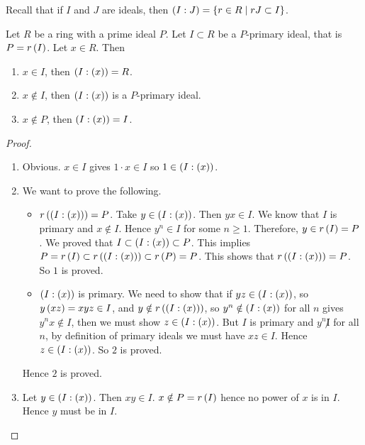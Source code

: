 \pagebreak

Recall that if $ I $ and $ J $ are ideals, then $ \left( I : J \right) = \left\{ r \in R \mid rJ \subset I \right\} $.

\begin{lemma}
\label{lem:11.7}
Let $ R $ be a ring with a prime ideal $ P $. Let $ I \subset R $ be a $ P $-primary ideal, that is $ P = r\left( I \right) $. Let $ x \in R $. Then
\begin{enumerate}
\item $ x \in I $, then $ \left( I : \left( x \right) \right) = R $.
\item $ x \notin I $, then $ \left( I : \left( x \right) \right) $ is a $ P $-primary ideal.
\item $ x \notin P $, then $ \left( I : \left( x \right) \right) = I $.
\end{enumerate}
\end{lemma}


\begin{proof}
\hfill
\begin{enumerate}
\item Obvious. $ x \in I $ gives $ 1 \cdot x \in I $ so $ 1 \in \left( I : \left( x \right) \right) $.
\item We want to prove the following.
\begin{itemize}
\item $ r\left( \left( I : \left( x \right) \right) \right) = P $. Take $ y \in \left( I : \left( x \right) \right) $. Then $ yx \in I $. We know that $ I $ is primary and $ x \notin I $. Hence $ y^n \in I $ for some $ n \ge 1 $. Therefore, $ y \in r\left( I \right) = P $. We proved that $ I \subset \left( I : \left( x \right) \right) \subset P $. This implies $ P = r\left( I \right) \subset r\left( \left( I : \left( x \right) \right) \right) \subset r\left( P \right) = P $. This shows that $ r\left( \left( I : \left( x \right) \right) \right) = P $. So $ 1 $ is proved.
\item $ \left( I : \left( x \right) \right) $ is primary. We need to show that if $ yz \in \left( I : \left( x \right) \right) $, so $ y\left( xz \right) = xyz \in I $, and $ y \notin r\left( \left( I : \left( x \right) \right) \right) $, so $ y^n \notin \left( I : \left( x \right) \right) $ for all $ n $ gives $ y^nx \notin I $, then we must show $ z \in \left( I : \left( x \right) \right) $. But $ I $ is primary and $ y^n \not I $ for all $ n $, by definition of primary ideals we must have $ xz \in I $. Hence $ z \in \left( I : \left( x \right) \right) $. So $ 2 $ is proved.
\end{itemize}
Hence $ 2 $ is proved.
\item Let $ y \in \left( I : \left( x \right) \right) $. Then $ xy \in I $. $ x \notin P = r\left( I \right) $ hence no power of $ x $ is in $ I $. Hence $ y $ must be in $ I $.
\end{enumerate}
\end{proof}


